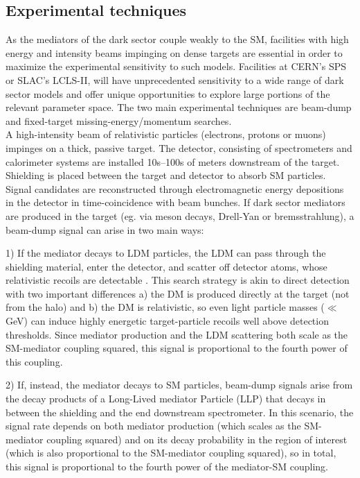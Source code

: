 \documentclass[../report.tex]{subfiles}
\begin{document}
\subsection{Experimental techniques}
As the mediators of the dark sector couple weakly to the SM, facilities with high energy and intensity beams impinging on dense targets are essential in order to maximize the experimental sensitivity to such models. Facilities at CERN's SPS or SLAC's LCLS-II, will have unprecedented sensitivity to a wide range of dark sector models and offer unique opportunities to explore large portions of the relevant parameter space. The two main experimental techniques are beam-dump and fixed-target missing-energy/momentum searches. \\


A high-intensity beam of relativistic particles (electrons, protons or muons) impinges on a thick, passive target. The detector, consisting of spectrometers and calorimeter systems are installed  10s--100s of meters downstream of the target. Shielding is placed between the target and detector to absorb SM particles. Signal candidates are reconstructed through electromagnetic energy depositions in the detector in time-coincidence with beam bunches.
If dark sector mediators are produced in the target (eg. via meson decays,  Drell-Yan or bremsstrahlung), a beam-dump signal can arise in two main ways:

1) If the mediator decays to LDM particles, the LDM can pass through the shielding material, enter the detector, and scatter off detector atoms, whose relativistic recoils are detectable \cite{deNiverville:2011it,Izaguirre:2013uxa}. %
This search strategy is akin to direct detection with two important differences a) the DM is produced directly at the target (not from the halo) and  b) the DM is relativistic, so even light particle masses ($\ll$GeV) can induce highly energetic target-particle recoils well above detection thresholds. Since mediator production  and the LDM scattering both scale as the SM-mediator coupling squared, this signal is proportional to the fourth power of this coupling.

2) If, instead, the mediator decays to SM particles, beam-dump signals arise from the decay products of a Long-Lived mediator Particle (LLP) that decays in between the shielding and the end downstream spectrometer. In this scenario, the signal rate depends on both mediator production (which scales as the SM-mediator coupling squared) and on its decay probability in the region of interest (which is also proportional to the SM-mediator coupling squared), so in total, this signal is proportional to the fourth power of the mediator-SM coupling. 
\end{document}
